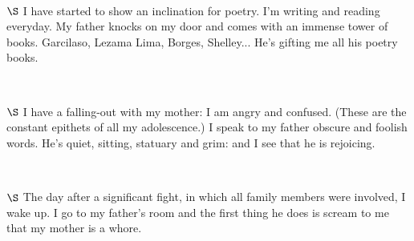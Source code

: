 \documentclass[a4paper, 12pt]{article}
\begin{document}
~ 

$\S$ I have started to show an inclination for poetry. I'm writing and reading
everyday. My father knocks on my door and comes with an immense tower of books.
Garcilaso, Lezama Lima, Borges, Shelley... He's gifting me all his poetry
books.

~ 

$\S$ I have a falling-out with my mother: I am angry and confused. (These are
the constant epithets of all my adolescence.) I speak to my father obscure and
foolish words. He's quiet, sitting, statuary and grim: and I see that he is
rejoicing.

~ 

$\S$ The day after a significant fight, in which all family members were
involved, I wake up. I go to my father's room and the first thing he does is
scream to me that my mother is a whore.
\end{document}
